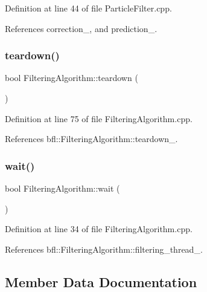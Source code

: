Definition at line 44 of file Particle\+Filter.\+cpp.



References correction\+\_\+, and prediction\+\_\+.

\mbox{\label{classbfl_1_1FilteringAlgorithm_a1dc912d89ee8f96d4f3e8209865c5308}} 
\subsubsection{\texorpdfstring{teardown()}{teardown()}}
{\footnotesize\ttfamily bool Filtering\+Algorithm\+::teardown (\begin{DoxyParamCaption}{ }\end{DoxyParamCaption})\hspace{0.3cm}{\ttfamily [inherited]}}



Definition at line 75 of file Filtering\+Algorithm.\+cpp.



References bfl\+::\+Filtering\+Algorithm\+::teardown\+\_\+.

\mbox{\label{classbfl_1_1FilteringAlgorithm_a40372c24fa050eb0274371172df0a244}} 
\subsubsection{\texorpdfstring{wait()}{wait()}}
{\footnotesize\ttfamily bool Filtering\+Algorithm\+::wait (\begin{DoxyParamCaption}{ }\end{DoxyParamCaption})\hspace{0.3cm}{\ttfamily [inherited]}}



Definition at line 34 of file Filtering\+Algorithm.\+cpp.



References bfl\+::\+Filtering\+Algorithm\+::filtering\+\_\+thread\+\_\+.



\subsection{Member Data Documentation}
\mbox{\label{classbfl_1_1ParticleFilter_a691428357c812ba009e995175778c173}} 
